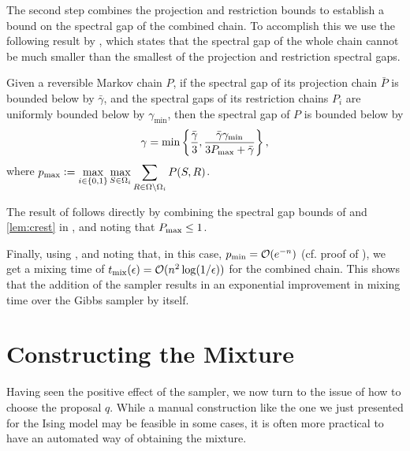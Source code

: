 The second step combines the projection and restriction bounds to establish a bound on the spectral gap of the combined chain.
To accomplish this we use the following result by \cite{jerrum04poincare}, which states that the spectral gap of the whole chain cannot be much smaller than the smallest of the projection and restriction spectral gaps.
\begin{theorem} \label{thm:jerrum04}
  Given a reversible Markov chain $P$, if the spectral gap of its projection chain $\bar{P}$ is bounded below by $\bar{\gamma}$, and the spectral gaps of its restriction chains $P_i$ are uniformly bounded below by $\gamma_{\textrm{min}}$, then the spectral gap of $P$ is bounded below by
  \begin{align*}
    \gamma = \min\left\{ \frac{\bar{\gamma}}{3}, \frac{\bar{\gamma}\gamma_{\textrm{min}}}{3P_{\textrm{max}} + \bar{\gamma}} \right\},
  \end{align*}
  where $p_{\textrm{max}} \vcentcolon= \displaystyle\max_{i \in \{0, 1\}}\max_{S \in \Omega_i} \sum_{R \in \Omega \setminus \Omega_i} P(S, R)$.
\end{theorem}

The result of  follows directly by combining the spectral gap bounds of  and \ref{lem:crest} in , and noting that $P_{\textrm{max}} \leq 1$.

Finally, using , and noting that, in this case, $p_{\textrm{min}} = \mathcal{O}(e^{-n})$ (cf. proof of ), we get a mixing time of $t_{\mathrm{mix}}(\epsilon) = \mathcal{O}(n^2 \log(1 / \epsilon))$ for the combined chain.
This shows that the addition of the \Ms{} sampler results in an exponential improvement in mixing time over the Gibbs sampler by itself.

\clearpage
\section{Constructing the Mixture}
Having seen the positive effect of the \Ms{} sampler, we now turn to the issue of how to choose the proposal $q$.
While a manual construction like the one we just presented for the Ising model may be feasible in some cases, it is often more practical to have an automated way of obtaining the mixture.

